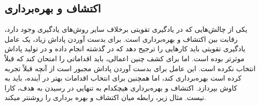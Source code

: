 %
\subsection*{اکتشاف و بهره‌برداری}
یکی از چالش‌هایی که در یادگیری تقویتی برخلاف سایر روش‌های یادگیری وجود دارد، رقابت بین اکتشاف و بهره‌برداری است. برای بدست آوردن پاداش زیاد، یک عامل یادگیری تقویتی باید کارهایی را ترجیح دهد که در گذشته انجام داده و در تولید پاداش موثرتر بوده است. اما برای کشف چنین اعمالی، باید اقداماتی را امتحان کند که قبلاً انتخاب نکرده است. این عامل برای بدست آوردن پاداش مجبور است از آنچه قبلاً تجربه کرده است بهره‌برداری کند، اما همچنین برای انتخاب اقدامات بهتر در آینده، باید به کاوش بپردازد. 
اکتشاف و بهره‌برداری هیچکدام به تنهایی در رسیدن به هدف، کارا نیست. مثال زیر، رابطه میان اکتشاف و بهره برداری را روشن\nf تر می\nf کند.
